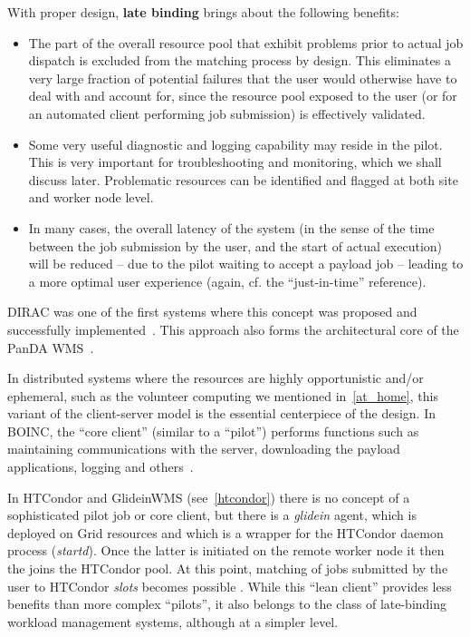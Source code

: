 With proper design,\textbf{ late binding} brings about the following benefits:
\begin{itemize}
\item The part of the overall resource pool that exhibit problems prior to actual job dispatch is excluded from the matching process by design.
This eliminates a very large fraction of potential failures that the user would otherwise have to deal with and account for, since the resource pool
exposed to the user (or for an automated client performing job submission) is effectively validated.

\item Some very useful diagnostic and logging capability may reside in the pilot. This is very important for troubleshooting and monitoring, which we shall discuss later.
Problematic resources can be identified and flagged at both site and worker node level.

\item In many cases, the overall latency of the system (in the sense of the time between the job submission by the user, and the start of actual execution) will be reduced --
due to the pilot waiting to accept a payload job -- leading to a more optimal user experience (again, cf. the ``just-in-time'' reference).
\end{itemize}

DIRAC was one of the first systems where this concept was proposed and successfully implemented~\cite{dirac_acat09}. This approach also forms the architectural core
of the PanDA WMS~\cite{panda_chep12}.

In distributed systems where the resources are highly opportunistic and/or ephemeral, such as the volunteer computing we mentioned in~\ref{at_home}, this variant
of the client-server model is the essential centerpiece of the design. In BOINC, the ``core client'' (similar to a ``pilot'') performs functions such as maintaining
communications with the server, downloading the payload applications, logging and others~\cite{boinc_client}.

In HTCondor and GlideinWMS (see~\ref{htcondor}) there is no concept of a sophisticated pilot job or core client, but there is a \textit{glidein} agent, which is deployed on Grid resources
and which is a wrapper for the HTCondor daemon process (\textit{startd}). Once the latter is initiated
on the remote worker node it then the joins the HTCondor pool. At this point, matching of jobs submitted by the user to HTCondor \textit{slots} becomes possible \cite{glideinwms}.
While this ``lean client'' provides less benefits than more complex ``pilots'', it also belongs to the class of late-binding workload management systems, although at a simpler level.


